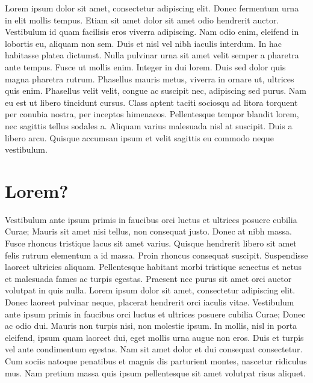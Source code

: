     \label{chapter:level-sets-1}

    Lorem ipsum dolor sit amet, consectetur adipiscing elit. Donec fermentum 
    urna in elit mollis tempus. Etiam sit amet dolor sit amet odio hendrerit 
    auctor. Vestibulum id quam facilisis eros viverra adipiscing. Nam odio 
    enim, eleifend in lobortis eu, aliquam non sem. Duis et nisl vel nibh 
    iaculis interdum. In hac habitasse platea dictumst. Nulla pulvinar urna 
    sit amet velit semper a pharetra ante tempus. Fusce ut mollis enim. Integer 
    in dui lorem. Duis sed dolor quis magna pharetra rutrum. Phasellus mauris 
    metus, viverra in ornare ut, ultrices quis enim. Phasellus velit velit, 
    congue ac suscipit nec, adipiscing sed purus. Nam eu est ut libero tincidunt 
    cursus. Class aptent taciti sociosqu ad litora torquent per conubia nostra, 
    per inceptos himenaeos. Pellentesque tempor blandit lorem, nec sagittis 
    tellus sodales a. Aliquam varius malesuada nisl at suscipit. Duis a libero 
    arcu. Quisque accumsan ipsum et velit sagittis eu commodo neque vestibulum.

\section{Lorem?}

    Vestibulum ante ipsum primis in faucibus orci luctus et ultrices posuere 
    cubilia Curae; Mauris sit amet nisi tellus, non consequat justo. Donec at 
    nibh massa. Fusce rhoncus tristique lacus sit amet varius. Quisque hendrerit 
    libero sit amet felis rutrum elementum a id massa. Proin rhoncus consequat 
    suscipit. Suspendisse laoreet ultricies aliquam. Pellentesque habitant morbi 
    tristique senectus et netus et malesuada fames ac turpis egestas. Praesent 
    nec purus sit amet orci auctor volutpat in quis nulla. Lorem ipsum dolor sit 
    amet, consectetur adipiscing elit. Donec laoreet pulvinar neque, placerat 
    hendrerit orci iaculis vitae. Vestibulum ante ipsum primis in faucibus orci 
    luctus et ultrices posuere cubilia Curae; Donec ac odio dui. Mauris non turpis 
    nisi, non molestie ipsum. In mollis, nisl in porta eleifend, ipsum quam 
    laoreet dui, eget mollis urna augue non eros. Duis et turpis vel ante 
    condimentum egestas. Nam sit amet dolor et dui consequat consectetur. Cum 
    sociis natoque penatibus et magnis dis parturient montes, nascetur ridiculus 
    mus. Nam pretium massa quis ipsum pellentesque sit amet volutpat risus aliquet.

